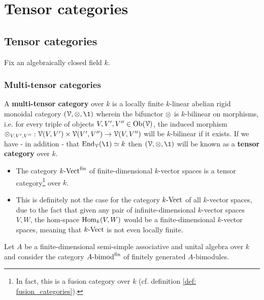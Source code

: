 \section{Tensor categories}
    \subsection{Tensor categories}
        \begin{convention}
            Fix an algebraically closed field $k$.
        \end{convention}
        
        \subsubsection{Multi-tensor categories}
            \begin{definition} \label{def: mutli_tensor_categories}
                A \textbf{multi-tensor category} over $k$ is a locally finite $k$-linear abelian rigid monoidal category $(\calV, \tensor, \1)$ wherein the bifunctor $\tensor$ is $k$-bilinear on morphisms, i.e. for every triple of objects $V, V', V'' \in \mathrm{Ob}(\mathcal{V})$, the induced morphism $\tensor_{V, V', V''}: \calV(V, V') \x \calV(V', V'') \to \calV(V, V'')$ will be $k$-bilinear if it exists. If we have - in addition - that $\End_{\calV}(\1) \cong k$ then $(\calV, \tensor, \1)$ will be known as a \textbf{tensor category} over $k$.
            \end{definition}
            \begin{example}
                \noindent
                \begin{itemize}
                    \item The category $k\text{-}\mathrm{Vect}^{\mathrm{fin}}$ of finite-dimensional $k$-vector spaces is a tensor category\footnote{In fact, this is a fusion category over $k$ (cf. definition \ref{def: fusion_categories}).} over $k$.
                    \item This is definitely not the case for the category $k\text{-}\mathrm{Vect}$ of all $k$-vector spaces, due to the fact that given any pair of infinite-dimensional $k$-vector spaces $V, W$, the hom-space $\mathrm{Hom}_k(V, W)$ would be a finite-dimensional $k$-vector spaces, meaning that $k\text{-}\mathrm{Vect}$ is not even locally finite.
                \end{itemize}
            \end{example}
            \begin{example}
                Let $A$ be a finite-dimensional semi-simple associative and unital algebra over $k$ and consider the category $A\text{-}\mathrm{bimod}^{\mathrm{fin}}$ of finitely generated $A$-bimodules. 
            \end{example}
